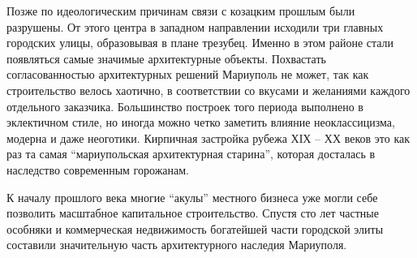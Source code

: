 Позже по идеологическим причинам связи с козацким прошлым были разрушены. От
этого центра в западном направлении исходили три главных городских улицы,
образовывая в плане трезубец. Именно в этом районе стали появляться самые
значимые архитектурные объекты. Похвастать согласованностью архитектурных
решений Мариуполь не может, так как строительство велось хаотично, в
соответствии со вкусами и желаниями каждого отдельного заказчика. Большинство
построек того периода выполнено в эклектичном стиле, но иногда можно четко
заметить влияние неоклассицизма, модерна и даже неоготики. Кирпичная застройка
рубежа ХІХ – ХХ веков это как раз та самая \enquote{мариупольская архитектурная
старина}, которая досталась в наследство современным горожанам.

К началу прошлого века многие \enquote{акулы} местного бизнеса уже могли себе позволить
масштабное капитальное строительство. Спустя сто лет частные особняки и
коммерческая недвижимость богатейшей части городской элиты составили
значительную часть архитектурного наследия Мариуполя.










